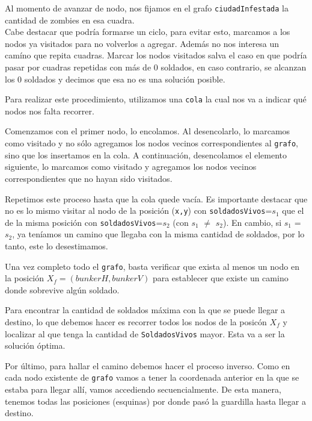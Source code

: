 Al momento de avanzar de nodo, nos fijamos en el grafo \texttt{ciudadInfestada} la cantidad de zombies en esa cuadra.\\

Cabe destacar que podr\'ia formarse un ciclo, para evitar esto, marcamos a los nodos ya visitados para no volverlos a agregar. Adem\'as no nos interesa un cam\'ino que repita cuadras. Marcar los nodos visitados salva el caso en que podr\'ia pasar por cuadras repetidas con m\'as de 0 soldados, en caso contrario, se alcanzan los 0 soldados y decimos que esa no es una soluci\'on posible.

Para realizar este procedimiento, utilizamos una \texttt{cola} la cual nos va a indicar qu\'e nodos nos falta recorrer.

Comenzamos con el primer nodo, lo encolamos. Al desencolarlo, lo marcamos como visitado y no s\'olo agregamos los nodos vecinos correspondientes al \texttt{grafo}, sino que los insertamos en la cola. A continuaci\'on, desencolamos el elemento siguiente, lo marcamos como visitado y agregamos los nodos vecinos correspondientes que no hayan sido visitados.

Repetimos este proceso hasta que la cola quede vac\'ia. Es importante destacar que no es lo mismo visitar al nodo de la posici\'on (\texttt{x,y}) con \texttt{soldadosVivos}=$s_1$ que el de la misma posici\'on con \texttt{soldadosVivos}=$s_2$ (con $s_1$ $\neq$ $s_2$).
En cambio, si $s_1$ = $s_2$, ya ten\'iamos un camino que llegaba con la misma cantidad de soldados, por lo tanto, este lo desestimamos.

Una vez completo todo el \texttt{grafo}, basta verificar que exista al menos un nodo en la posici\'on $X_f = (bunkerH, bunkerV)$ para establecer que existe un camino donde sobrevive alg\'un soldado.

Para encontrar la cantidad de soldados m\'axima con la que se puede llegar a destino, lo que debemos hacer es recorrer todos los nodos de la posic\'on $X_f$ y localizar al que tenga la cantidad de \texttt{SoldadosVivos} mayor. Esta va a ser la soluci\'on \'optima.

Por \'ultimo, para hallar el camino debemos hacer el proceso inverso. Como en cada nodo existente de \texttt{grafo} vamos a tener la coordenada anterior en la que se estaba para llegar all\'i, vamos accediendo secuencialmente. De esta manera, tenemos todas las posiciones (esquinas) por donde pas\'o la guardilla hasta llegar a destino.\\

